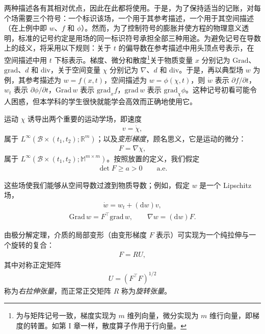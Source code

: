 \documentclass[../../main.tex]{subfiles}
\begin{document}
两种描述各有其相对优点，因此在此都将使用。于是，为了保持适当的记账，对每个场需要三个符号：一个标识该场，一个用于其参考描述，一个用于其空间描述（在上例中即 $w$、$f$ 和 $\phi$）。然而，为了控制符号的膨胀并使方程的物理意义透明，标准的记号约定是用场的同一标识符号承担全部三种用途。为避免记号在导数上的歧义，将采用以下规则：关于 $t$ 的偏导数在参考描述中用头顶点号表示，在空间描述中用 $t$ 下标表示。梯度、微分和散度\footnote{为与矩阵记号一致，梯度实现为 $m$ 维列向量，微分实现为 $m$ 维行向量，即梯度的转置。如第 I 章一样，散度算子作用于行向量。}关于物质变量 $x$ 分别记为 $\mathrm{Grad}$、$\mathrm{grad}$、$d$ 和 $\mathrm{div}$，关于空间变量 $\chi$ 分别记为 $\nabla$、$d$ 和 $\mathrm{div}$。于是，再以典型场 $w$ 为例，其参考描述为 $w=f(x,t)$，空间描述为 $w=\phi(\chi,t)$，则 $\dot{w}$ 表示 $\partial f/\partial t$，$w_{t}$ 表示 $\partial\phi/\partial t$，$\mathrm{Grad}\,w$ 表示 $\mathrm{grad}_{x}f$，$\mathrm{grad}\,w$ 表示 $\mathrm{grad}_{\chi}\phi$。这种记号初看可能令人困惑，但本学科的学生很快就能学会高效而正确地使用它。

运动 $\chi$ 诱导出两个重要的运动学场，即速度
\begin{align}
v=\dot{\chi},
\label{align:ch02-2-1-1}
\end{align}
属于 $L^{\infty}(\mathscr{B}\times(t_{1},t_{2});\mathbb{R}^{m})$；以及\emph{变形梯度}，顾名思义，它是运动的微分：
\begin{align}
F=\nabla\chi,
\label{align:ch02-2-1-2}
\end{align}
属于 $L^{\infty}(\mathscr{B}\times(t_{1},t_{2});\mathbb{M}^{m\times m})$。按照放置的定义，我们假定
\begin{align}
\det F\geqslant a>0\qquad\text{a.e.}
\label{align:ch02-2-1-3}
\end{align}

这些场使我们能够从空间导数过渡到物质导数；例如，假定 $w$ 是一个 Lipschitz 场，
\begin{align}
\dot{w}=w_{t}+(\mathrm{d}w)v,
\label{align:ch02-2-1-4}
\end{align}
\begin{align}
\mathrm{Grad}\,w=F^{\top}\mathrm{grad}\,w,\qquad\nabla w=(\mathrm{d}w)F.
\label{align:ch02-2-1-5}
\end{align}

由极分解定理，介质的局部变形（由变形梯度 $F$ 表示）可实现为一个纯拉伸与一个旋转的复合：
\begin{align}
F=RU,
\label{align:ch02-2-1-6}
\end{align}
其中对称正定矩阵
\begin{align}
U=(F^{\top}F)^{1/2}
\label{align:ch02-2-1-7}
\end{align}
称为\emph{右拉伸张量}，而正常正交矩阵 $R$ 称为\emph{旋转张量}。
\end{document}
